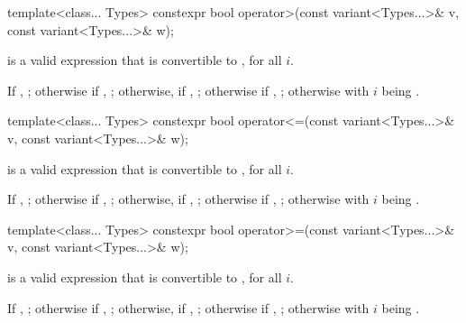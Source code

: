 %
\begin{itemdecl}
template<class... Types>
  constexpr bool operator>(const variant<Types...>& v, const variant<Types...>& w);
\end{itemdecl}

\begin{itemdescr}
\pnum
\constraints
{} is a valid expression that is
convertible to , for all $i$.

\pnum
\returns
If , ;
otherwise if , ;
otherwise, if , ;
otherwise if , ;
otherwise  with $i$ being .
\end{itemdescr}

%
\begin{itemdecl}
template<class... Types>
  constexpr bool operator<=(const variant<Types...>& v, const variant<Types...>& w);
\end{itemdecl}

\begin{itemdescr}
\pnum
\constraints
{} is a valid expression that is
convertible to , for all $i$.

\pnum
\returns
If , ;
otherwise if , ;
otherwise, if , ;
otherwise if , ;
otherwise  with $i$ being .
\end{itemdescr}

%
\begin{itemdecl}
template<class... Types>
  constexpr bool operator>=(const variant<Types...>& v, const variant<Types...>& w);
\end{itemdecl}

\begin{itemdescr}
\pnum
\constraints
{} is a valid expression that is
convertible to , for all $i$.

\pnum
\returns
If , ;
otherwise if , ;
otherwise, if , ;
otherwise if , ;
otherwise  with $i$ being .
\end{itemdescr}


